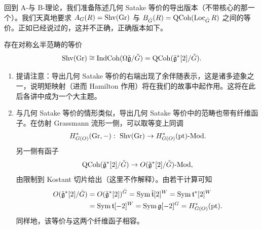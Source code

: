 回到 A-与 B-理论，我们准备陈述几何 Satake 等价的导出版本（不带核心的那一个）。我们天真地要求 $A_G(R)=\operatorname{Shv}(\operatorname{Gr})$ 与 $B_{\check G}(R)=\operatorname{QCoh}(\operatorname{Loc}_{\check G}R)$ 之间的等价。正如已经说过的，这并不正确，正确版本如下。

\begin{thm}
存在对称幺半范畴的等价
\[
  \operatorname{Shv}(\operatorname{Gr})\cong\operatorname{IndCoh}(\Omega\check{\mathfrak g}/\check G)=\operatorname{QCoh}(\check{\mathfrak g}^*[2]/\check G).
\]
\end{thm}

\begin{rem}
\begin{enumerate}[label=(\arabic*),leftmargin=1.8em,itemsep=0.2em]
  \item 提请注意：导出几何 Satake 等价的右端出现了余伴随表示，这是诸多迹象之一，说明矩映射（进而 Hamilton 作用）将在我们的故事中起作用。这将在此后各讲中成为一个大主题。
  \item 与几何 Satake 等价的情形类似，导出几何 Satake 等价中的范畴也带有纤维函子。在仿射 Grassmann 流形一侧，可以取等变上同调
  \[
    H^*_{G(O)}(\operatorname{Gr},-):\ \operatorname{Shv}(\operatorname{Gr})\to H^*_{G(O)}(\mathrm{pt})\text{-}\mathrm{Mod}.
  \]
  另一侧有函子
  \[
    \operatorname{QCoh}(\check{\mathfrak g}^*[2]/\check G)\to O(\check{\mathfrak g}^*[2]/\check G)\text{-}\mathrm{Mod},
  \]
  由限制到 Kostant 切片给出（这里不作解释）。由若干计算可知
  \[
    \begin{aligned}
      O(\check{\mathfrak g}^*[2]/\check G)&=O(\check{\mathfrak g}^*[2])^{\check G}=\operatorname{Sym}\check{\mathfrak t}[2]^W=\operatorname{Sym}\mathfrak t^*[2]^W\\
      &=\operatorname{Sym}\mathfrak t[-2]^W=\operatorname{Sym}\mathfrak g[-2]^G=H^*_{G(O)}(\mathrm{pt}).
    \end{aligned}
  \]
  同样地，该等价与这两个纤维函子相容。
\end{enumerate}
\end{rem}
